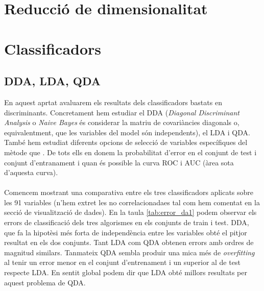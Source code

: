 \documentclass[a4paper,10pt]{article}
\begin{document}


\section{Reducció de dimensionalitat}

\section{Classificadors}
\subsection{DDA, LDA, QDA}
En aquest aprtat avaluarem els resultats dels classificadors bastats en discriminants. Concretament hem estudiar el DDA (\textit{Diagonal Discriminant Analysis} o  \textit{Naive Bayes} és considerar la matriu de covariàncies diagonals o, equivalentment, que les variables del model són independents), el LDA i QDA. També hem estudiat diferents opcions de selecció de variables específiques del mètode que . De tots ells en donem la probabilitat d'error en el conjunt de test i conjunt d'entranament i quan és possible la curva ROC i AUC (àrea sota d'aquesta curva).
\\
\\
Comencem mostrant una comparativa entre els tres classificadors aplicats sobre les 91 variables (n'hem extret les no correlacionadaes tal com hem comentat en la secció de visualització de dades). En la taula \ref{tab:error_da1} podem observar els errors de classificació dels tres algorismes en els conjunts de train i test. DDA, que fa la hipotèsi més forta de independència entre les variables obté el pitjor resultat en els dos conjunts. Tant LDA com QDA obtenen errors amb ordres de magnitud similars. Tanmateix QDA sembla produir una mica més de \textit{overfitting} al tenir un error menor en el conjunt d'entrenament i un superior al de test respecte LDA. En sentit global podem dir que LDA obté millors resultats per aquest problema de QDA. 
\end{document}
